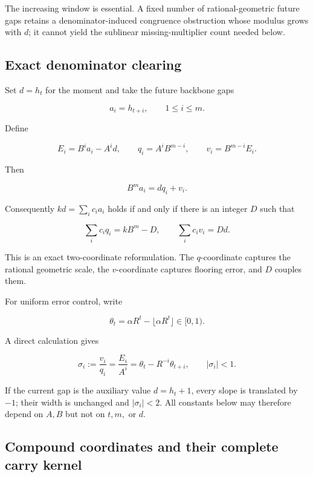 The increasing window is essential.  A fixed number of rational-geometric
future gaps retains a denominator-induced congruence obstruction whose modulus
grows with $d$; it cannot yield the sublinear missing-multiplier count needed
below.

\subsection{Exact denominator clearing}

Set $d=h_t$ for the moment and take the future backbone gaps

\[
  a_i=h_{t+i},\qquad1\le i\le m.
\]

Define

\begin{equation}
  E_i=B^i a_i-A^i d,\qquad
  q_i=A^iB^{m-i},\qquad
  v_i=B^{m-i}E_i.
  \label{eq:qv-definition}
\end{equation}

Then

\begin{equation}
  B^m a_i=dq_i+v_i.
  \label{eq:two-coordinate}
\end{equation}

Consequently $kd=\sum_i c_i a_i$ holds if and only if there is an integer
$D$ such that

\begin{equation}
  \sum_i c_iq_i=kB^m-D,\qquad
  \sum_i c_iv_i=Dd.
  \label{eq:coupled-coordinates}
\end{equation}

This is an exact two-coordinate reformulation.  The $q$-coordinate captures
the rational geometric scale, the $v$-coordinate captures flooring error, and
$D$ couples them.

For uniform error control, write

\[
  \theta_t=\alpha R^t-\lfloor\alpha R^t\rfloor\in[0,1).
\]

A direct calculation gives

\begin{equation}
  \sigma_i:=\frac{v_i}{q_i}
  =\frac{E_i}{A^i}
  =\theta_t-R^{-i}\theta_{t+i},
  \qquad |\sigma_i|<1.
  \label{eq:slopes}
\end{equation}

If the current gap is the auxiliary value $d=h_t+1$, every slope is translated
by $-1$; their width is unchanged and $|\sigma_i|<2$.  All constants below may
therefore depend on $A,B$ but not on $t,m,$ or $d$.

\subsection{Compound coordinates and their complete carry kernel}

